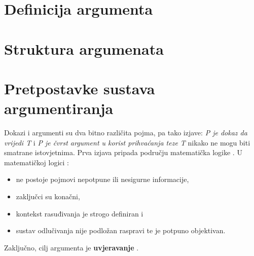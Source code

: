 
\section{Definicija argumenta}



\section{Struktura argumenata}



\section{Pretpostavke sustava argumentiranja}
Dokazi i argumenti su dva bitno različita pojma, pa tako izjave: \emph{P je dokaz da vrijedi T} i \emph{P je čvrst argument u korist prihvaćanja teze T} nikako ne mogu biti smatrane istovjetnima. Prva izjava pripada području matematička logike . U matematičkoj logici \citep{bench2007argumentation}:
\begin{itemize}
\item ne postoje pojmovi nepotpune ili nesigurne informacije,
\item zaključci su konačni,
\item kontekst rasuđivanja je strogo definiran i
\item sustav odlučivanja nije podložan raspravi te je potpuno objektivan. 
\end{itemize} 

Zaključno, cilj argumenta je \textbf{uvjeravanje} .